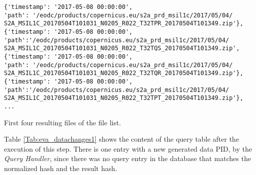 \documentclass[draft,final]{vutinfth} %
\newenvironment{code}{\captionsetup{type=listing}}{}
\begin{document}
\begin{enumerate}
	\begin{code}
		\begin{verbatim}
{'timestamp': '2017-05-08 00:00:00', 
'path': '/eodc/products/copernicus.eu/s2a_prd_msil1c/2017/05/04/
S2A_MSIL1C_20170504T101031_N0205_R022_T32TPR_20170504T101349.zip'}, 
{'timestamp': '2017-05-08 00:00:00',
'path':'/eodc/products/copernicus.eu/s2a_prd_msil1c/2017/05/04/
S2A_MSIL1C_20170504T101031_N0205_R022_T32TQS_20170504T101349.zip', 
{'timestamp': '2017-05-08 00:00:00', 
'path': '/eodc/products/copernicus.eu/s2a_prd_msil1c/2017/05/04/
S2A_MSIL1C_20170504T101031_N0205_R022_T32TQR_20170504T101349.zip'}, 
{'timestamp': '2017-05-08 00:00:00',
'path':'/eodc/products/copernicus.eu/s2a_prd_msil1c/2017/05/04/
S2A_MSIL1C_20170504T101031_N0205_R022_T32TPT_20170504T101349.zip'},
...
		\end{verbatim}
		\caption{First four resulting files of the file list.}
		\label{lst:eva_datachange_rf1}
	\end{code}
	
	Table \ref{Tab:eva_datachanges1} shows the content of the query table after the execution of this step. There is one entry with a new generated data PID, by the \textit{Query Handler}, since there was no query entry in the database that matches the normalized hash and the result hash. 
	
	

\end{enumerate}
\end{document}
